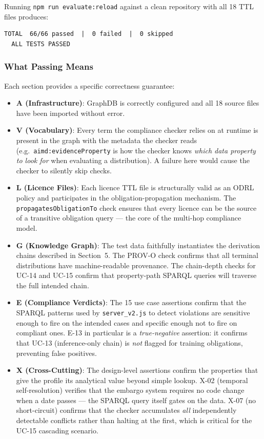 \documentclass[12pt,a4paper]{article}
\begin{document}
Running \texttt{npm run evaluate:reload} against a clean repository with all 18 TTL files produces:

\begin{lstlisting}[language={}]
TOTAL  66/66 passed  |  0 failed  |  0 skipped
  ALL TESTS PASSED
\end{lstlisting}

\subsubsection*{What Passing Means}

Each section provides a specific correctness guarantee:

\begin{itemize}[noitemsep]
  \item \textbf{A (Infrastructure)}: GraphDB is correctly configured and all 18 source files have been imported without error.

  \item \textbf{V (Vocabulary)}: Every term the compliance checker relies on at runtime is present in the graph with the metadata the checker reads (e.g.\ \texttt{aimd:evidenceProperty} is how the checker knows \emph{which data property to look for} when evaluating a distribution). A failure here would cause the checker to silently skip checks.

  \item \textbf{L (Licence Files)}: Each licence TTL file is structurally valid as an ODRL policy and participates in the obligation-propagation mechanism. The \texttt{propagatesObligationTo} check ensures that every licence can be the source of a transitive obligation query — the core of the multi-hop compliance model.

  \item \textbf{G (Knowledge Graph)}: The test data faithfully instantiates the derivation chains described in Section~5. The PROV-O check confirms that all terminal distributions have machine-readable provenance. The chain-depth checks for UC-14 and UC-15 confirm that property-path SPARQL queries will traverse the full intended chain.

  \item \textbf{E (Compliance Verdicts)}: The 15 use case assertions confirm that the SPARQL patterns used by \texttt{server\_v2.js} to detect violations are sensitive enough to fire on the intended cases and specific enough not to fire on compliant ones. E-13 in particular is a \emph{true-negative} assertion: it confirms that UC-13 (inference-only chain) is \emph{not} flagged for training obligations, preventing false positives.

  \item \textbf{X (Cross-Cutting)}: The design-level assertions confirm the properties that give the profile its analytical value beyond simple lookup. X-02 (temporal self-resolution) verifies that the embargo system requires no code change when a date passes — the SPARQL query itself gates on the data. X-07 (no short-circuit) confirms that the checker accumulates \emph{all} independently detectable conflicts rather than halting at the first, which is critical for the UC-15 cascading scenario.
\end{itemize}
\end{document}
